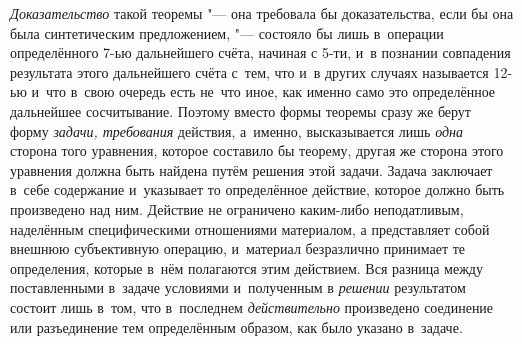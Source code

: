 {\em Доказательство} такой теоремы "--- она требовала бы доказательства, если
бы она была синтетическим предложением, "--- состояло бы лишь в~операции
определённого 7-ью дальнейшего счёта, начиная с 5-ти, и~в познании
совпадения результата этого дальнейшего счёта с~тем, что и~в других случаях
называется 12-ью и~что в~свою очередь есть не~что иное, как именно само это
определённое дальнейшее сосчитывание. Поэтому вместо формы теоремы сразу же
берут форму {\em задачи, требования} действия,
а~именно, высказывается лишь {\em одна}
сторона того уравнения, которое составило бы теорему, другая
же сторона этого уравнения должна быть найдена путём решения этой задачи.
Задача заключает в~себе содержание и~указывает то определённое действие,
которое должно быть произведено над ним. Действие не ограничено каким-либо
неподатливым, наделённым специфическими отношениями материалом, а
представляет собой внешнюю субъективную операцию, и~материал безразлично
принимает те определения, которые в~нём полагаются этим действием. Вся
разница между поставленными в~задаче условиями и~полученным в {\em решении}
результатом состоит лишь в~том, что в~последнем {\em действительно}
произведено соединение или разъединение тем определённым
образом, как было указано в~задаче.

